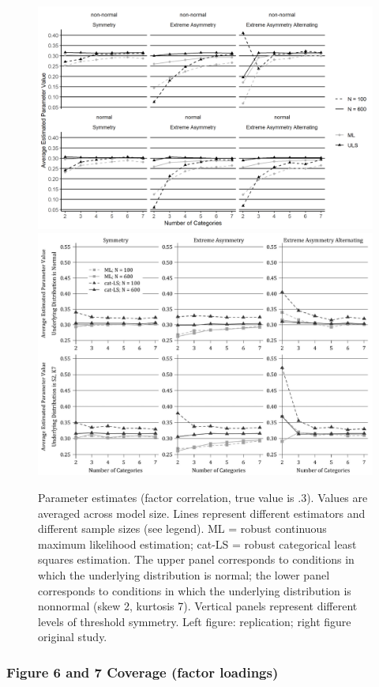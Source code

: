 \documentclass[10,a4paperpaper,]{article}
\begin{document}
\begin{figure}
\includegraphics[width=0.49\linewidth]{./figures/fig_5} \includegraphics[width=0.49\linewidth]{./figures/fig5_original} \caption{Parameter estimates (factor correlation, true value is .3). Values are averaged across model size. Lines represent different estimators and different sample sizes (see legend). ML = robust continuous maximum likelihood estimation; cat-LS = robust categorical least squares estimation. The upper panel corresponds to conditions in which the underlying distribution is normal; the lower panel corresponds to conditions in which the underlying distribution is nonnormal (skew 2, kurtosis 7). Vertical panels represent different levels of threshold symmetry. Left figure: replication; right figure original study.}\label{fig:fig5}
\end{figure}

\subsubsection{Figure 6 and 7 Coverage (factor loadings)}
\end{document}
